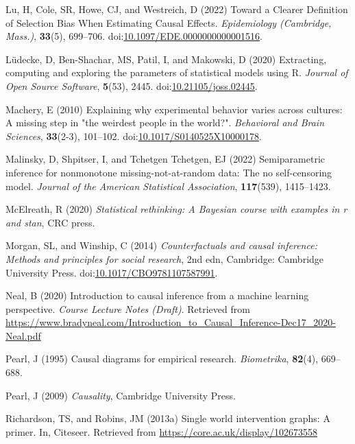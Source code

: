 \documentclass[
  single column]{article}
\newlength{\cslhangindent}
\newenvironment{CSLReferences}[2] %
 {\begin{list}{}{%
  \setlength{\itemindent}{0pt}
  \setlength{\leftmargin}{0pt}
  \setlength{\parsep}{0pt}
  \ifodd #1
   \setlength{\leftmargin}{\cslhangindent}
   \setlength{\itemindent}{-1\cslhangindent}
  \fi
  \setlength{\itemsep}{#2\baselineskip}}}
 {\end{list}}
\begin{document}
\begin{CSLReferences}{1}{0}
Lu, H, Cole, SR, Howe, CJ, and Westreich, D (2022) Toward a Clearer
Definition of Selection Bias When Estimating Causal Effects.
\emph{Epidemiology (Cambridge, Mass.)}, \textbf{33}(5), 699--706.
doi:\href{https://doi.org/10.1097/EDE.0000000000001516}{10.1097/EDE.0000000000001516}.

Lüdecke, D, Ben-Shachar, MS, Patil, I, and Makowski, D (2020)
Extracting, computing and exploring the parameters of statistical models
using {R}. \emph{Journal of Open Source Software}, \textbf{5}(53), 2445.
doi:\href{https://doi.org/10.21105/joss.02445}{10.21105/joss.02445}.

Machery, E (2010) Explaining why experimental behavior varies across
cultures: A missing step in "the weirdest people in the world?".
\emph{Behavioral and Brain Sciences}, \textbf{33}(2-3), 101--102.
doi:\href{https://doi.org/10.1017/S0140525X10000178}{10.1017/S0140525X10000178}.

Malinsky, D, Shpitser, I, and Tchetgen Tchetgen, EJ (2022)
Semiparametric inference for nonmonotone missing-not-at-random data: The
no self-censoring model. \emph{Journal of the American Statistical
Association}, \textbf{117}(539), 1415--1423.

McElreath, R (2020) \emph{Statistical rethinking: A {B}ayesian course
with examples in r and stan}, CRC press.

Morgan, SL, and Winship, C (2014) \emph{Counterfactuals and causal
inference: Methods and principles for social research}, 2nd edn,
Cambridge: Cambridge University Press.
doi:\href{https://doi.org/10.1017/CBO9781107587991}{10.1017/CBO9781107587991}.

Neal, B (2020) Introduction to causal inference from a machine learning
perspective. \emph{Course Lecture Notes (Draft)}. Retrieved from
\url{https://www.bradyneal.com/Introduction_to_Causal_Inference-Dec17_2020-Neal.pdf}

Pearl, J (1995) Causal diagrams for empirical research.
\emph{Biometrika}, \textbf{82}(4), 669--688.

Pearl, J (2009) \emph{Causality}, Cambridge University Press.

Richardson, TS, and Robins, JM (2013a) Single world intervention graphs:
A primer. In, Citeseer. Retrieved from
\url{https://core.ac.uk/display/102673558}


\end{CSLReferences}
\end{document}

